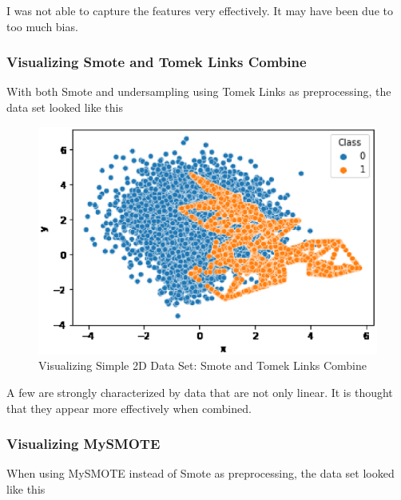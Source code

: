 I was not able to capture the features very effectively.
It may have been due to too much bias.

\clearpage
\subsubsection{Visualizing Smote and Tomek Links Combine}
With both Smote and undersampling using Tomek Links as preprocessing, the data set looked like this
\begin{center}
    \begin{figure}[ht]
        \caption{Visualizing Simple 2D Data Set: Smote and Tomek Links Combine}
        \label{tab:team-rating-features}
        \begin{center}
            \includegraphics[scale=0.6]{image/combine.eps}
        \end{center}
    \end{figure}
\end{center}
A few are strongly characterized by data that are not only linear.
It is thought that they appear more effectively when combined.

\clearpage
\subsubsection{Visualizing MySMOTE}
When using MySMOTE instead of Smote as preprocessing, the data set looked like this

